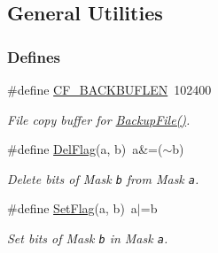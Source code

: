 \hypertarget{group__utilities}{
\subsection{General Utilities}
\label{group__utilities}
}
\subsubsection*{Defines}
\begin{CompactItemize}
\item 
\hypertarget{group__utilities_g4211f4b332e79ab5f3c691a4ab6ebaf9}{
\#define \hyperlink{group__utilities_g4211f4b332e79ab5f3c691a4ab6ebaf9}{CF\_\-BACKBUFLEN}~102400}
\label{group__utilities_g4211f4b332e79ab5f3c691a4ab6ebaf9}

\begin{CompactList}\small\item\em File copy buffer for \hyperlink{group__utilities_g0fccda7427db33b2f73a3b6dca864207}{BackupFile()}. \item\end{CompactList}\item 
\hypertarget{group__utilities_gbfbf02b37e47027916f3352798f7d44c}{
\#define \hyperlink{group__utilities_gbfbf02b37e47027916f3352798f7d44c}{DelFlag}(a, b)~a\&=($\sim$b)}
\label{group__utilities_gbfbf02b37e47027916f3352798f7d44c}

\begin{CompactList}\small\item\em Delete bits of Mask {\tt b} from Mask {\tt a}. \item\end{CompactList}\item 
\hypertarget{group__utilities_gfcc4d6e712f81df21ea69277d42af839}{
\#define \hyperlink{group__utilities_gfcc4d6e712f81df21ea69277d42af839}{SetFlag}(a, b)~a$|$=b}
\label{group__utilities_gfcc4d6e712f81df21ea69277d42af839}

\begin{CompactList}\small\item\em Set bits of Mask {\tt b} in Mask {\tt a}. \item\end{CompactList}\end{CompactItemize}

